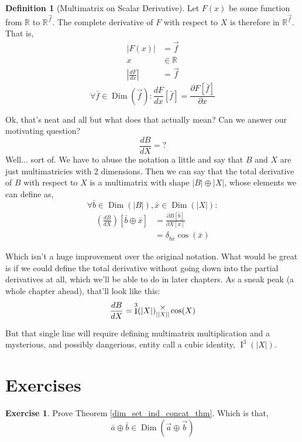 \documentclass[12pt]{book}
\theoremstyle{plain}
\theoremstyle{definition}
\newtheorem{definition}{Definition}[chapter]
\newtheorem{exercise}{Exercise}[chapter]
\theoremstyle{ppart}
\theoremstyle{case}
\theoremstyle{solution}
\DeclareMathOperator{\Dim}{Dim}
\DeclareMathOperator{\Ident}{I}
\newcommand{\mmult}[1]{\text{\raisebox{1ex}{$\underset{#1}{\times}$}}}
\newcommand{\shape}[1]{\left|#1\right|}
\begin{document}
\begin{definition}[Multimatrix on Scalar Derivative]
\label{ms_derivative}
Let $F(x)$ be some function from $\mathbb{R}$ to $\mathbb{R}^{\vec{f}}$.
The complete derivative of $F$ with respect to $X$ is therefore in
$\mathbb{R}^{\vec{f}}$. That is,
\begin{align*}
\shape{F(x)} &= \vec{f} \\
x &\in \mathbb{R} \\
\shape{\frac{dF}{dx}} &= \vec{f}
\end{align*}
\[
\forall \bar{f} \in \Dim(\vec{f}):
        \frac{dF}{dx}[\bar{f}] =
        \frac{\partial F[\bar{f}]}{\partial x}
\]
\end{definition}

Ok, that's neat and all but what does that actually mean? Can we answer our motivating 
question?
\[\frac{dB}{dX} = ? \]
Well... sort of. We have to abuse the notation a little and say that $B$ and $X$ are
just multimatricies with 2 dimensions. Then we can say that the total derivative
of $B$ with respect to $X$ is a multimatrix with shape $\shape{B} \oplus \shape{X}$,
whose elements we can define as,
\[\forall \bar{b} \in \Dim(\shape{B}), \bar{x} \in \Dim(\shape{X}):\]
\begin{align*}
\left( \frac{dB}{dX} \right)[\bar{b} \oplus \bar{x}]
&= \frac{\partial B[\bar{b}]}{\partial X[\bar{x}]} \\
&= \delta_{\bar{b}\bar{x}}\cos(\bar{x})
\end{align*}

Which isn't a huge improvement over the original notation. What would be great is
if we could define the total derivative without going down into the partial derivatives
at all, which we'll be able to do in later chapters. As a sneak peak (a whole
chapter ahead), that'll look like this:
\[
\frac{dB}{dX} = \Ident^3(\shape{X}) \mmult{\shape{\shape{X}}} \cos(X)
\]

But that single line will require defining multimatrix multiplication and
a mysterious, and possibly dangerious, entity call a cubic identity, $\Ident^3(\shape{X})$.

\section{Exercises}

\begin{exercise}
\label{dim_set_ind_concat_ex}
Prove Theorem \ref{dim_set_ind_concat_thm}. Which is that,
\[ \bar{a} \oplus \bar{b} \in \Dim(\vec{a} \oplus \vec{b}) \]
\end{exercise}
\end{document}
